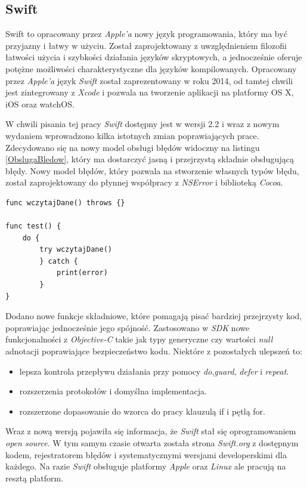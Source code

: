 \documentclass{iiuwb}
\begin{document}
\subsection{Swift}
Swift \cite{Lassoff:2014:Swift} to opracowany przez \textit{Apple'a} nowy język programowania, który ma być przyjazny i łatwy w użyciu. Został zaprojektowany z uwzględnieniem filozofii łatwości użycia i szybkości działania języków skryptowych, a jednocześnie oferuje potężne możliwości charakterystyczne dla języków kompilowanych.	 Opracowany przez \textit{Apple'a} język \textit{Swift} został zaprezentowany w roku 2014, od tamtej chwili jest zintegrowany z \textit{Xcode} i pozwala na tworzenie aplikacji na platformy OS X, iOS oraz watchOS. 

W chwili pisania tej pracy \textit{Swift} dostępny jest w wersji 2.2 i wraz z nowym wydaniem wprowadzono kilka istotnych zmian poprawiających prace. Zdecydowano się na nowy model obsługi błędów widoczny na listingu \ref{ObslugaBledow}, który ma dostarczyć jasną i przejrzystą składnie obsługującą błędy. Nowy model błędów, który pozwala na stworzenie własnych typów błędu, został zaprojektowany do płynnej współpracy z \textit{NSError} i biblioteką \textit{Cocoa}.
\begin{lstlisting}[label=ObslugaBledow, caption=Nowy model obsługi błedów w Swift]
func wczytajDane() throws {}

func test() {
	do {
		try wczytajDane()
		} catch {
			print(error)
		}
}
\end{lstlisting}
Dodano nowe funkcje składniowe, które pomagają pisać bardziej przejrzysty kod, poprawiając jednocześnie jego spójność. Zastosowano w \textit{SDK} nowe funkcjonalności z \textit{Objective-C} takie jak typy generyczne czy wartości \textit{null} adnotacji poprawiające bezpieczeństwo kodu. Niektóre z pozostałych ulepszeń to:
\begin{itemize}
\item lepsza kontrola przepływu działania przy pomocy \textit{do},\textit{guard}, \textit{defer} i \textit{repeat}.    
\item rozszerzenia protokołów i domyślna implementacja.
\item rozszerzone dopasowanie do wzorca do pracy klauzulą if i pętlą for.
\end{itemize}
Wraz z nową wersją pojawiła się informacja, że \textit{Swift} stał się oprogramowaniem \textit{open source}. W tym samym czasie otwarta została strona \textit{Swift.org} z dostępnym kodem, rejestratorem błędów i systematycznymi wersjami developerskimi dla każdego. Na razie \textit{Swift} obsługuje platformy \textit{Apple} oraz \textit{Linux} ale pracują na resztą platform.
\end{document}
